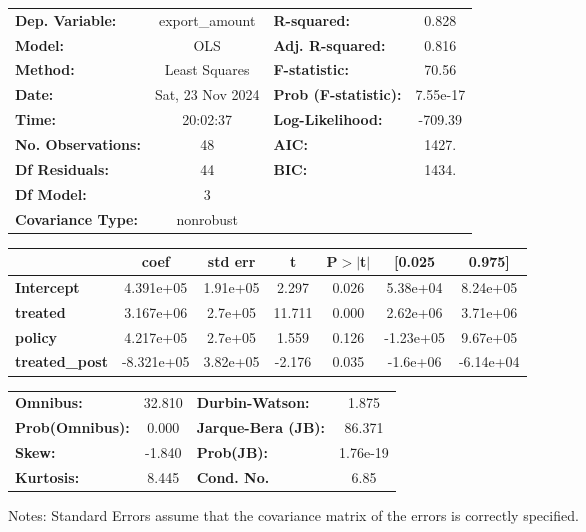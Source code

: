 \begin{center}
\begin{tabular}{lclc}
\toprule
\textbf{Dep. Variable:}    &  export\_amount  & \textbf{  R-squared:         } &     0.828   \\
\textbf{Model:}            &       OLS        & \textbf{  Adj. R-squared:    } &     0.816   \\
\textbf{Method:}           &  Least Squares   & \textbf{  F-statistic:       } &     70.56   \\
\textbf{Date:}             & Sat, 23 Nov 2024 & \textbf{  Prob (F-statistic):} &  7.55e-17   \\
\textbf{Time:}             &     20:02:37     & \textbf{  Log-Likelihood:    } &   -709.39   \\
\textbf{No. Observations:} &          48      & \textbf{  AIC:               } &     1427.   \\
\textbf{Df Residuals:}     &          44      & \textbf{  BIC:               } &     1434.   \\
\textbf{Df Model:}         &           3      & \textbf{                     } &             \\
\textbf{Covariance Type:}  &    nonrobust     & \textbf{                     } &             \\
\bottomrule
\end{tabular}
\begin{tabular}{lcccccc}
                       & \textbf{coef} & \textbf{std err} & \textbf{t} & \textbf{P$> |$t$|$} & \textbf{[0.025} & \textbf{0.975]}  \\
\midrule
\textbf{Intercept}     &    4.391e+05  &     1.91e+05     &     2.297  &         0.026        &     5.38e+04    &     8.24e+05     \\
\textbf{treated}       &    3.167e+06  &      2.7e+05     &    11.711  &         0.000        &     2.62e+06    &     3.71e+06     \\
\textbf{policy}        &    4.217e+05  &      2.7e+05     &     1.559  &         0.126        &    -1.23e+05    &     9.67e+05     \\
\textbf{treated\_post} &   -8.321e+05  &     3.82e+05     &    -2.176  &         0.035        &     -1.6e+06    &    -6.14e+04     \\
\bottomrule
\end{tabular}
\begin{tabular}{lclc}
\textbf{Omnibus:}       & 32.810 & \textbf{  Durbin-Watson:     } &    1.875  \\
\textbf{Prob(Omnibus):} &  0.000 & \textbf{  Jarque-Bera (JB):  } &   86.371  \\
\textbf{Skew:}          & -1.840 & \textbf{  Prob(JB):          } & 1.76e-19  \\
\textbf{Kurtosis:}      &  8.445 & \textbf{  Cond. No.          } &     6.85  \\
\bottomrule
\end{tabular}
\end{center}

Notes: \newline
 [1] Standard Errors assume that the covariance matrix of the errors is correctly specified.